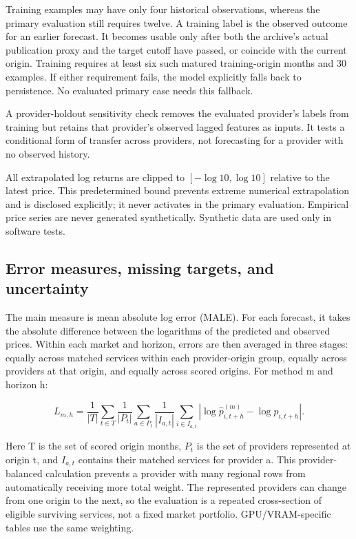 \documentclass[10pt]{article}
\begin{document}
Training examples may have only four historical observations, whereas the primary evaluation still requires twelve. A training label is the observed outcome for an earlier forecast. It becomes usable only after both the archive's actual publication proxy and the target cutoff have passed, or coincide with the current origin. Training requires at least six such matured training-origin months and 30 examples. If either requirement fails, the model explicitly falls back to persistence. No evaluated primary case needs this fallback.

A provider-holdout sensitivity check removes the evaluated provider's labels from training but retains that provider's observed lagged features as inputs. It tests a conditional form of transfer across providers, not forecasting for a provider with no observed history.

All extrapolated log returns are clipped to $[-\log 10,\log 10]$ relative to the latest price. This predetermined bound prevents extreme numerical extrapolation and is disclosed explicitly; it never activates in the primary evaluation. Empirical price series are never generated synthetically. Synthetic data are used only in software tests.

\subsection{Error measures, missing targets, and uncertainty}

The main measure is mean absolute log error (MALE). For each forecast, it takes the absolute difference between the logarithms of the predicted and observed prices. Within each market and horizon, errors are then averaged in three stages: equally across matched services within each provider-origin group, equally across providers at that origin, and equally across scored origins. For method m and horizon h:

\begin{equation}
 L_{m,h}=\frac{1}{|T|}\sum_{t\in T}\frac{1}{|P_t|}\sum_{a\in P_t}
 \frac{1}{|I_{a,t}|}\sum_{i\in I_{a,t}}
 \left|\log\widehat p^{(m)}_{i,t+h}-\log p_{i,t+h}\right|.
\end{equation}

Here T is the set of scored origin months, $P_t$ is the set of providers represented at origin t, and $I_{a,t}$ contains their matched services for provider a. This provider-balanced calculation prevents a provider with many regional rows from automatically receiving more total weight. The represented providers can change from one origin to the next, so the evaluation is a repeated cross-section of eligible surviving services, not a fixed market portfolio. GPU/VRAM-specific tables use the same weighting.
\end{document}
